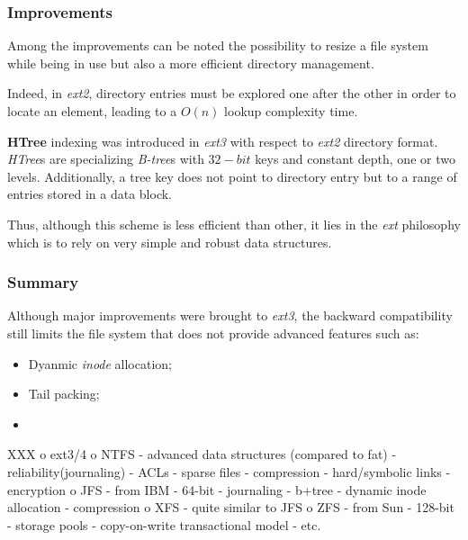 
\begin{frame}
  \frametitle{Improvements}

  Among the improvements can be noted the possibility to resize a file system
  while being in use but also a more efficient directory management.

  \-

  Indeed, in \textit{ext2}, directory entries must be explored one after the
  other in order to locate an element, leading to a $O(n)$ lookup complexity
  time.

  \-

  \textbf{HTree} indexing was introduced in \textit{ext3} with respect to
  \textit{ext2} directory format. \textit{HTree}s are specializing
  \textit{B-tree}s with $32-bit$ keys and constant depth, one or two levels.
  Additionally, a tree key does not point to directory entry but to a range
  of entries stored in a data block.

  \-

  Thus, although this scheme is less efficient than other, it lies in the
  \textit{ext} philosophy which is to rely on very simple and robust data
  structures.
\end{frame}


\begin{frame}
  \frametitle{Summary}

  Although major improvements were brought to \textit{ext3}, the backward
  compatibility still limits the file system that does not provide advanced
  features such as:

  \begin{itemize}
    \item
      Dyanmic \textit{inode} allocation;
    \item
      Tail packing;
    \item
      
  \end{itemize}
\end{frame}


XXX
 o ext3/4
 o NTFS
  - advanced data structures (compared to fat)
  - reliability(journaling)
  - ACLs
  - sparse files
  - compression
  - hard/symbolic links
  - encryption
 o JFS
  - from IBM
  - 64-bit
  - journaling
  - b+tree
  - dynamic inode allocation
  - compression
 o XFS
  - quite similar to JFS
 o ZFS
  - from Sun
  - 128-bit
  - storage pools
  - copy-on-write transactional model
  - etc.

